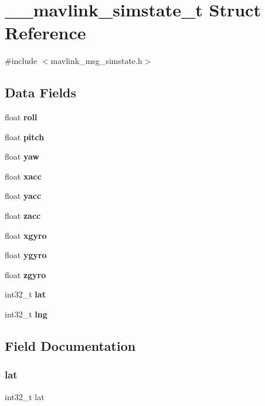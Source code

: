 \section{\+\_\+\+\_\+mavlink\+\_\+simstate\+\_\+t Struct Reference}
\label{struct____mavlink__simstate__t}


{\ttfamily \#include $<$mavlink\+\_\+msg\+\_\+simstate.\+h$>$}

\subsection*{Data Fields}
\begin{DoxyCompactItemize}
\item 
float \textbf{ roll}
\item 
float \textbf{ pitch}
\item 
float \textbf{ yaw}
\item 
float \textbf{ xacc}
\item 
float \textbf{ yacc}
\item 
float \textbf{ zacc}
\item 
float \textbf{ xgyro}
\item 
float \textbf{ ygyro}
\item 
float \textbf{ zgyro}
\item 
int32\+\_\+t \textbf{ lat}
\item 
int32\+\_\+t \textbf{ lng}
\end{DoxyCompactItemize}


\subsection{Field Documentation}
\mbox{\label{struct____mavlink__simstate__t_a58d1cfb46a8035aadcb0d2b3f178e1ed}} 
\subsubsection{lat}
{\footnotesize\ttfamily int32\+\_\+t lat}

\mbox{\label{struct____mavlink__simstate__t_a821ea8a67976a7186afd96e810b51315}} 
